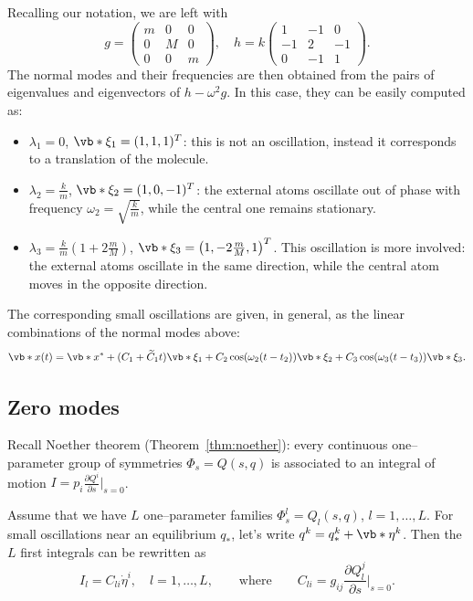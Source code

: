 \documentclass[english,fontsize=11pt,paper=b5]{scrbook}
\theoremstyle{definition}
\begin{document}
    Recalling our notation, we are left with
    \begin{equation}
      g = \begin{pmatrix}m&0&0\\0&M&0\\0&0&m\end{pmatrix},
      \quad
      h = k\begin{pmatrix}1&-1&0\\-1&2&-1\\0&-1&1\end{pmatrix}.
    \end{equation}
    The normal modes and their frequencies are then obtained from the pairs of eigenvalues and eigenvectors of $h - \omega^2 g$. In this case, they can be easily computed as:
    \begin{itemize}
      \item $\lambda_1 = 0$, $\vb*{\xi}_1 = (1,1,1)^T$: this is not an oscillation, instead it corresponds to a translation of the molecule.
      \item $\lambda_2 = \frac km$, $\vb*{\xi}_2 = (1,0,-1)^T$: the external atoms oscillate out of phase with frequency $\omega_2 = \sqrt{\frac km}$, while the central one remains stationary.
      \item $\lambda_3 = \frac km \left(1+2 \frac mM\right)$, $\vb*{\xi}_3 = \left(1,-2\frac mM,1\right)^T$. This oscillation is more involved: the external atoms oscillate in the same direction, while the central atom moves in the opposite direction.
    \end{itemize}
    The corresponding small oscillations are given, in general, as the linear combinations of the normal modes above:
    \begin{equation}
      \vb*{x}(t) = \vb*{x}^* + (C_1 + \widetilde C_1 t) \vb*{\xi}_1 + C_2 \cos(\omega_2 (t-t_2)) \vb*{\xi}_2 + C_3 \cos(\omega_3 (t-t_3)) \vb*{\xi}_3.
    \end{equation}

    \subsection{Zero modes}

    Recall Noether theorem (Theorem~\ref{thm:noether}): every continuous one--parameter group of symmetries $\Phi_s = Q(s,q)$ is associated to an integral of motion $I = p_i \frac{\partial Q^i}{\partial s}\big|_{s=0}$.

    Assume that we have $L$ one--parameter families $\Phi^l_s = Q_l(s,q)$, $l=1,\ldots,L$.
    For small oscillations near an equilibrium $q_*$, let's write $q^k = q^k_* + \vb*{\eta}^k$. Then the $L$ first integrals can be rewritten as
    \begin{equation}
      I_l = C_{li} \dot\eta^i,\quad l=1,\ldots, L,
      \qquad\mbox{where}\qquad
      C_{li} = g_{ij} \frac{\partial Q^j_l}{\partial s}\Big|_{s=0}.
    \end{equation}
\end{document}

